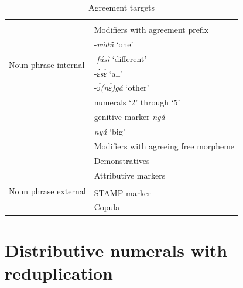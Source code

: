 \begin{table}[!h]
\begin{tabular}{l|l}
 \midrule
\multirow{ 7}{*}{Noun phrase internal} &   \\
& Modifiers with agreement prefix \\
& \hspace{.5cm}	-{\itshape vúdũ̂} `one' \\
& \hspace{.5cm}	-{\itshape fúsì} `different' \\
& \hspace{.5cm}	-{\itshape ɛ́sɛ̀} `all' \\
& \hspace{.5cm}	-{\itshape ɔ́(nɛ́)gá} `other' \\
& \hspace{.5cm}	numerals `2' through `5' \\
& \hspace{.5cm}	genitive marker {\itshape ngá} \\
& \hspace{.5cm}	{\itshape nyá} `big' \\
& Modifiers with agreeing free morpheme \\
& \hspace{.5cm}	Demonstratives \\
& \hspace{.5cm}	Attributive markers \\  \midrule
\multirow{ 2}{*}{Noun phrase external} & \\
& \hspace{.5cm}	STAMP marker \\
& \hspace{.5cm}	Copula \\
 \midrule
\end{tabular}
\caption{Agreement targets}
\label{Tab:AGRtargets}
\end{table}













 



\section{Distributive numerals with reduplication} 
\label{sec:Distr}

